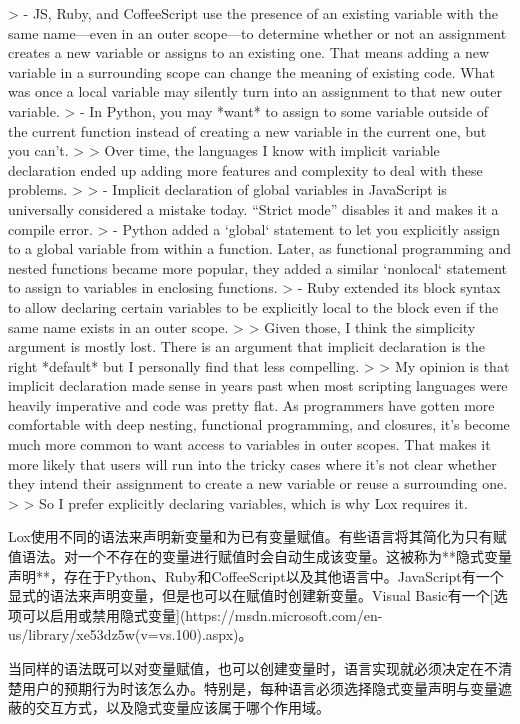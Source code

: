 \documentclass[cn,11pt,chinese]{elegantbook}
\begin{document}
{> - JS, Ruby, and CoffeeScript use the presence of an existing variable with the same name—even in an outer scope—to determine whether or not an assignment creates a new variable or assigns to an existing one. That means adding a new variable in a surrounding scope can change the meaning of existing code. What was once a local variable may silently turn into an assignment to that new outer variable.
> - In Python, you may *want* to assign to some variable outside of the current function instead of creating a new variable in the current one, but you can’t.
>
> Over time, the languages I know with implicit variable declaration ended up adding more features and complexity to deal with these problems.
>
> - Implicit declaration of global variables in JavaScript is universally considered a mistake today. “Strict mode” disables it and makes it a compile error.
> - Python added a `global` statement to let you explicitly assign to a global variable from within a function. Later, as functional programming and nested functions became more popular, they added a similar `nonlocal` statement to assign to variables in enclosing functions.
> - Ruby extended its block syntax to allow declaring certain variables to be explicitly local to the block even if the same name exists in an outer scope.
>
> Given those, I think the simplicity argument is mostly lost. There is an argument that implicit declaration is the right *default* but I personally find that less compelling.
>
> My opinion is that implicit declaration made sense in years past when most scripting languages were heavily imperative and code was pretty flat. As programmers have gotten more comfortable with deep nesting, functional programming, and closures, it’s become much more common to want access to variables in outer scopes. That makes it more likely that users will run into the tricky cases where it’s not clear whether they intend their assignment to create a new variable or reuse a surrounding one.
>
> So I prefer explicitly declaring variables, which is why Lox requires it.

Lox使用不同的语法来声明新变量和为已有变量赋值。有些语言将其简化为只有赋值语法。对一个不存在的变量进行赋值时会自动生成该变量。这被称为**隐式变量声明**，存在于Python、Ruby和CoffeeScript以及其他语言中。JavaScript有一个显式的语法来声明变量，但是也可以在赋值时创建新变量。Visual Basic有一个[选项可以启用或禁用隐式变量](https://msdn.microsoft.com/en-us/library/xe53dz5w(v=vs.100).aspx)。

当同样的语法既可以对变量赋值，也可以创建变量时，语言实现就必须决定在不清楚用户的预期行为时该怎么办。特别是，每种语言必须选择隐式变量声明与变量遮蔽的交互方式，以及隐式变量应该属于哪个作用域。

}
\end{document}
